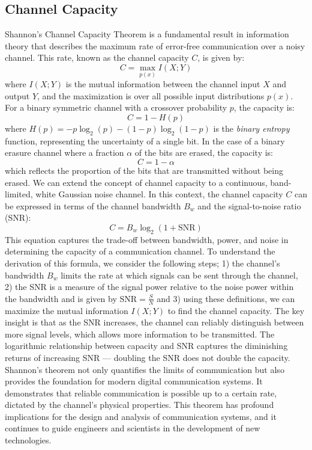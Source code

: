\documentclass[12pt]{article}
\begin{document}
		\subsection{Channel Capacity}
		Shannon's Channel Capacity Theorem is a fundamental result in information theory that describes the maximum rate of error-free communication over a noisy channel. This rate, known as the channel capacity \(C\), is given by:
		\[ C = \max_{p(x)} I(X; Y) \]
		where \(I(X; Y)\) is the mutual information between the channel input \(X\) and output \(Y\), and the maximization is over all possible input distributions \(p(x)\). For a binary symmetric channel with a crossover probability \(p\), the capacity is:
		\[ C = 1 - H(p) \]
		where \(H(p) = -p \log_2(p) - (1-p) \log_2(1-p)\) is the \emph{binary entropy} function, representing the uncertainty of a single bit. In the case of a binary erasure channel where a fraction \(\alpha\) of the bits are erased, the capacity is:
		\[ C = 1 - \alpha \]
		which reflects the proportion of the bits that are transmitted without being erased. We can extend the concept of channel capacity to a continuous, band-limited, white Gaussian noise channel. In this context, the channel capacity \(C\) can be expressed in terms of the channel bandwidth \(B_w\) and the signal-to-noise ratio (SNR):
		\[ C = B_w \log_2 (1 + \text{SNR}) \]
		This equation captures the trade-off between bandwidth, power, and noise in determining the capacity of a communication channel. To understand the derivation of this formula, we consider the following steps; 1) the channel's bandwidth \(B_w\) limits the rate at which signals can be sent through the channel, 2) the SNR is a measure of the signal power relative to the noise power within the bandwidth and is given by \(\text{SNR} = \frac{S}{N}\) and 3) using these definitions, we can maximize the mutual information \(I(X; Y)\) to find the channel capacity. The key insight is that as the SNR increases, the channel can reliably distinguish between more signal levels, which allows more information to be transmitted. The logarithmic relationship between capacity and SNR captures the diminishing returns of increasing SNR — doubling the SNR does not double the capacity. Shannon's theorem not only quantifies the limits of communication but also provides the foundation for modern digital communication systems. It demonstrates that reliable communication is possible up to a certain rate, dictated by the channel's physical properties. This theorem has profound implications for the design and analysis of communication systems, and it continues to guide engineers and scientists in the development of new technologies.
		
\end{document}
